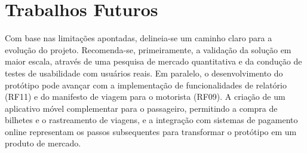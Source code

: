 \section{Trabalhos Futuros}

Com base nas limitações apontadas, delineia-se um caminho claro para a evolução do projeto. Recomenda-se, primeiramente, a validação da solução em maior escala, através de uma pesquisa de mercado quantitativa e da condução de testes de usabilidade com usuários reais. Em paralelo, o desenvolvimento do protótipo pode avançar com a implementação de funcionalidades de relatório (RF11) e do manifesto de viagem para o motorista (RF09). A criação de um aplicativo móvel complementar para o passageiro, permitindo a compra de bilhetes e o rastreamento de viagens, e a integração com sistemas de pagamento online representam os passos subsequentes para transformar o protótipo em um produto de mercado.
